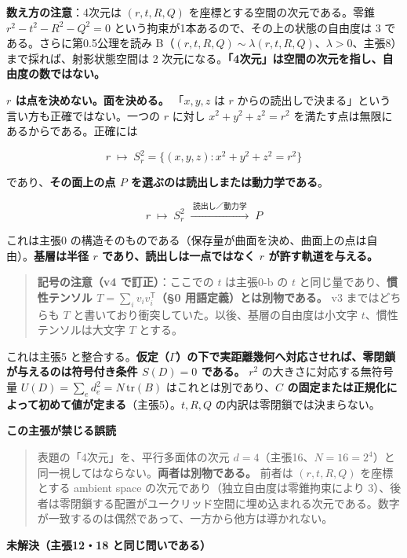 \documentclass[
  10pt,
]{ltjsarticle}
\begin{document}
\textbf{数え方の注意}：4次元は \((r,t,R,Q)\)
を座標とする空間の次元である。零錐 \(r^2-t^2-R^2-Q^2=0\)
という拘束が1本あるので、その上の状態の自由度は 3
である。さらに第0.5公理を読み
B（\((r,t,R,Q)\sim\lambda(r,t,R,Q)\)、\(\lambda>0\)、主張8）まで採れば、射影状態空間は
2 次元になる。\textbf{「4次元」は空間の次元を指し、自由度の数ではない。}

\textbf{\(r\) は点を決めない。面を決める。} 「\(x,y,z\) は \(r\)
からの読出しで決まる」という言い方も正確ではない。一つの \(r\) に対し
\(x^2+y^2+z^2 = r^2\) を満たす点は無限にあるからである。正確には

\[\boxed{\;r \;\longmapsto\; S_r^2 = \{(x,y,z) : x^2+y^2+z^2 = r^2\}\;}\]

であり、\textbf{その面上の点 \(P\) を選ぶのは読出しまたは動力学である}。

\[r \;\longmapsto\; S_r^2 \;\xrightarrow{\;\text{読出し／動力学}\;}\; P\]

これは主張0
の構造そのものである（保存量が曲面を決め、曲面上の点は自由）。\textbf{基層は半径
\(r\) であり、読出しは一点ではなく \(r\) が許す軌道を与える。}

\begin{quote}
\textbf{記号の注意（v4 で訂正）}：ここでの \(t\) は主張0-b の \(t\)
と同じ量であり、\textbf{慣性テンソル
\(T = \sum_i v_iv_i^{\mathsf T}\)（§0 用語定義）とは別物である。} v3
まではどちらも \(T\)
と書いており衝突していた。以後、基層の自由度は小文字
\(t\)、慣性テンソルは大文字 \(T\) とする。
\end{quote}

これは主張5
と整合する。\textbf{仮定（\(\Gamma\)）の下で実距離幾何へ対応させれば、零閉鎖が与えるのは符号付き条件
\(S(D)=0\) である。} \(r^2\) の大きさに対応する無符号量
\(U(D) = \sum_e d_e^2 = N\,\mathrm{tr}(B)\)
はこれとは別であり、\textbf{\(C\)
の固定または正規化によって初めて値が定まる}（主張5）。\(t, R, Q\)
の内訳は零閉鎖では決まらない。

\textbf{この主張が禁じる誤読}

\begin{quote}
表題の「4次元」を、平行多面体の次元
\(d = 4\)（主張16、\(N = 16 = 2^4\)）と同一視してはならない。\textbf{両者は別物である。}
前者は \((r,t,R,Q)\) を座標とする ambient space
の次元であり（独立自由度は零錐拘束により
3）、後者は零閉鎖する配置がユークリッド空間に埋め込まれる次元である。数字が一致するのは偶然であって、一方から他方は導かれない。
\end{quote}

\textbf{未解決（主張12・18 と同じ問いである）}
\end{document}

